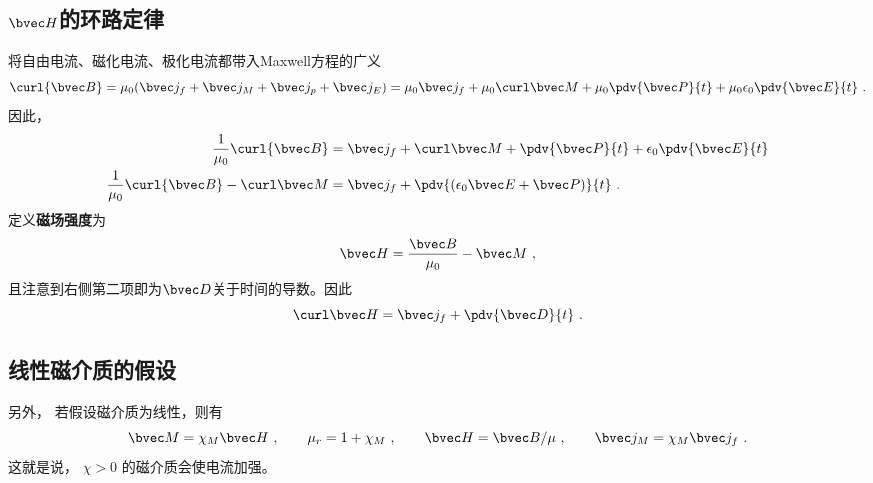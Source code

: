 \subsection{$\bvec H$的环路定律}
将自由电流、磁化电流、极化电流都带入Maxwell方程的广义
\begin{equation}
\curl {\bvec B} = \mu_0 (\bvec j_f + \bvec j_M + \bvec j_p + \bvec j_E) = \mu_0 \bvec j_f + \mu_0 \curl \bvec M + \mu_0 \pdv{\bvec P}{t} + \mu_0 \epsilon_0 \pdv{\bvec E}{t}~.
\end{equation}
因此，
\begin{align}
\frac{1}{\mu_0}\curl {\bvec B} &= \bvec j_f + \curl \bvec M + \pdv{\bvec P}{t} + \epsilon_0 \pdv{\bvec E}{t}\\
\frac{1}{\mu_0}\curl {\bvec B} - \curl \bvec M &= \bvec j_f + \pdv{(\epsilon_0\bvec E+\bvec P)}{t}~.\\
\end{align}
定义\textbf{磁场强度}为
\begin{equation}
\bvec H = \frac{\bvec B}{\mu_0} - \bvec M~,
\end{equation}
且注意到右侧第二项即为$\bvec D$关于时间的导数。因此
\begin{equation}
\curl \bvec H = \bvec j_f + \pdv{\bvec D}{t}~.
\end{equation}

\subsection{线性磁介质的假设}
另外， 若假设磁介质为线性，则有
\begin{equation}
\bvec M = \chi_M \bvec H~,
\qquad
\mu_r = 1 + \chi_M~,
\qquad
\bvec H = \bvec B/\mu~,
\qquad
\bvec j_M = \chi_M \bvec j_f~.
\end{equation}
这就是说， $\chi > 0$ 的磁介质会使电流加强。
